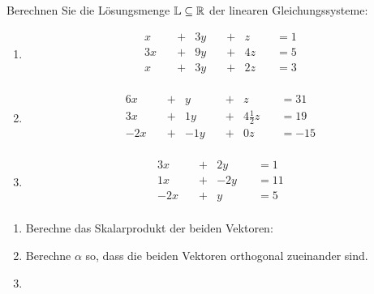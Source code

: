 \newcommand{\lgslinethree}[4]{#1 x\quad &+&  #2 y\quad &+&  #3 z\quad & = #4 \\}
\newcommand{\lgslinetwo}[3]{#1 x\quad &+&  #2 y\quad & = #3 \\}
Berechnen Sie die Lösungsmenge $\mathbb{L}\subseteq\mathbb{R}$ der linearen Gleichungssysteme:
\begin{multicols}{2}
	\begin{enumerate}
		\item
		\begin{alignat*}{5}
			\lgslinethree{}{3}{}{1}
			\lgslinethree{3}{9}{4}{5}
			\lgslinethree{}{3}{2}{3}
		\end{alignat*}
		\item
		\begin{alignat*}{4}
			\lgslinethree{6}{}{}{31}
			\lgslinethree{3}{1}{4\frac 1 2}{19}
			\lgslinethree{-2}{-1}{0}{-15}
		\end{alignat*}
		\item
		\begin{alignat*}{4}
			\lgslinetwo{3}{2}{1}
			\lgslinetwo{1}{-2}{11}
			\lgslinetwo{-2}{}{5}
		\end{alignat*}
	\end{enumerate}
\end{multicols}



\begin{enumerate}
	\item Berechne das Skalarprodukt der beiden Vektoren:
	\item Berechne $\alpha$ so, dass die beiden Vektoren orthogonal zueinander sind.
	\item
\end{enumerate}


